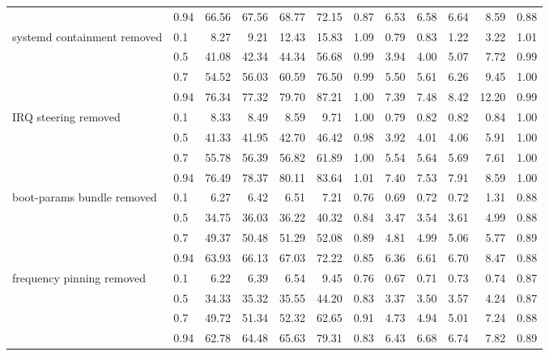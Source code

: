 \begin{table}
{\begin{tabular}{llrrrrrrrrrr}
 & 0.94 & 66.56 & 67.56 & 68.77 & 72.15 & 0.87 & 6.53 & 6.58 & 6.64 & 8.59 & 0.88 \\
\cmidrule{1-12}
\multirow[t]{4}{*}{systemd containment removed} & 0.1 & 8.27 & 9.21 & 12.43 & 15.83 & 1.09 & 0.79 & 0.83 & 1.22 & 3.22 & 1.01 \\
 & 0.5 & 41.08 & 42.34 & 44.34 & 56.68 & 0.99 & 3.94 & 4.00 & 5.07 & 7.72 & 0.99 \\
 & 0.7 & 54.52 & 56.03 & 60.59 & 76.50 & 0.99 & 5.50 & 5.61 & 6.26 & 9.45 & 1.00 \\
 & 0.94 & 76.34 & 77.32 & 79.70 & 87.21 & 1.00 & 7.39 & 7.48 & 8.42 & 12.20 & 0.99 \\
\cmidrule{1-12}
\multirow[t]{4}{*}{IRQ steering removed} & 0.1 & 8.33 & 8.49 & 8.59 & 9.71 & 1.00 & 0.79 & 0.82 & 0.82 & 0.84 & 1.00 \\
 & 0.5 & 41.33 & 41.95 & 42.70 & 46.42 & 0.98 & 3.92 & 4.01 & 4.06 & 5.91 & 1.00 \\
 & 0.7 & 55.78 & 56.39 & 56.82 & 61.89 & 1.00 & 5.54 & 5.64 & 5.69 & 7.61 & 1.00 \\
 & 0.94 & 76.49 & 78.37 & 80.11 & 83.64 & 1.01 & 7.40 & 7.53 & 7.91 & 8.59 & 1.00 \\
\cmidrule{1-12}
\multirow[t]{4}{*}{boot-params bundle removed} & 0.1 & 6.27 & 6.42 & 6.51 & 7.21 & 0.76 & 0.69 & 0.72 & 0.72 & 1.31 & 0.88 \\
 & 0.5 & 34.75 & 36.03 & 36.22 & 40.32 & 0.84 & 3.47 & 3.54 & 3.61 & 4.99 & 0.88 \\
 & 0.7 & 49.37 & 50.48 & 51.29 & 52.08 & 0.89 & 4.81 & 4.99 & 5.06 & 5.77 & 0.89 \\
 & 0.94 & 63.93 & 66.13 & 67.03 & 72.22 & 0.85 & 6.36 & 6.61 & 6.70 & 8.47 & 0.88 \\
\cmidrule{1-12}
\multirow[t]{4}{*}{frequency pinning removed} & 0.1 & 6.22 & 6.39 & 6.54 & 9.45 & 0.76 & 0.67 & 0.71 & 0.73 & 0.74 & 0.87 \\
 & 0.5 & 34.33 & 35.32 & 35.55 & 44.20 & 0.83 & 3.37 & 3.50 & 3.57 & 4.24 & 0.87 \\
 & 0.7 & 49.72 & 51.34 & 52.32 & 62.65 & 0.91 & 4.73 & 4.94 & 5.01 & 7.24 & 0.88 \\
 & 0.94 & 62.78 & 64.48 & 65.63 & 79.31 & 0.83 & 6.43 & 6.68 & 6.74 & 7.82 & 0.89 \\
\cmidrule{1-12}
\bottomrule
\end{tabular}%
}
\end{table}
